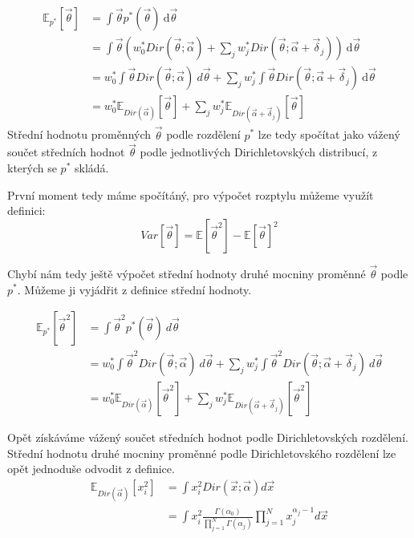 \begin{align}
\mathbb{E}_{p^*}[\vec\theta] &= \int \vec\theta p^*(\vec\theta) ~ \mathrm{d}\vec\theta
\\
&= \int \vec\theta (
	w_0^* Dir(\vec{\theta}; \vec{\alpha}) +
	\sum_j w^*_j
        	Dir(\vec{\theta}; \vec{\alpha} + \vec{\delta}_j)
    ) ~ \mathrm{d}\vec\theta
\\
&= w_0^* \int \vec\theta Dir(\vec{\theta}; \vec{\alpha}) ~ d\vec\theta +
	\sum_j w_j^* \int \vec\theta Dir(\vec{\theta}; \vec{\alpha} + \vec{\delta}_j)
    ~ \mathrm{d}\vec\theta
\\
&= w_0^* \mathbb{E}_{Dir(\vec\alpha)}[\vec\theta] +
	\sum_j w_j^* \mathbb{E}_{Dir(\vec\alpha + \vec{\delta}_j)}[\vec\theta]
\end{align}
Střední hodnotu proměnných $\vec\theta$ podle rozdělení $p^*$ lze tedy spočítat
jako vážený součet středních hodnot $\vec\theta$ podle jednotlivých
Dirichletovských distribucí, z kterých se $p^*$ skládá.

První moment tedy máme spočítáný, pro výpočet rozptylu můžeme využít
definici:
\begin{equation}
	Var[\vec{\theta}] = \mathbb{E}[\vec{\theta}^2] - \mathbb{E}[\vec\theta]^2
\end{equation}

Chybí nám tedy ještě výpočet střední hodnoty druhé mocniny proměnné
$\vec\theta$ podle $p^*$. Můžeme ji vyjádřit z definice střední hodnoty.

\begin{align}
\mathbb{E}_{p^*}[\vec\theta^2] &= \int \vec\theta^2 p^*(\vec\theta) ~ d\vec\theta
\\
&= w_0^* \int \vec\theta^2 Dir(\vec{\theta}; \vec{\alpha}) ~ d\vec\theta +
	\sum_j w_j^* \int \vec\theta^2 Dir(\vec{\theta}; \vec{\alpha} + \vec{\delta}_j)
	 ~ d\vec\theta
\\
&= w_0^* \mathbb{E}_{Dir(\vec\alpha)}[\vec\theta^2] +
	\sum_j w_j^* \mathbb{E}_{Dir(\vec\alpha + \vec{\delta}_j)}[\vec\theta^2]
\end{align}

Opět získáváme vážený součet středních hodnot podle Dirichletovských rozdělení.
Střední hodnotu druhé mocniny proměnné podle Dirichletovského rozdělení
lze opět jednoduše odvodit z definice.
\begin{align}
\mathbb{E}_{Dir(\vec\alpha)}[x_i^2] &=
	\int x_i^2 Dir(\vec x; \vec\alpha) d\vec x
\\
&=
	\int x_i^2 \frac{\Gamma(\alpha_0)}
			   {\prod_{j=1}^N \Gamma(\alpha_j)}
		\prod_{j=1}^N x_j^{\alpha_j - 1} d\vec x
\end{align}

